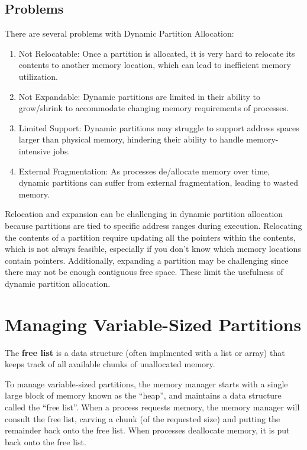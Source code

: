 \documentclass{report}
\newcommand{\definitionBegin}[1]{\begin{tcolorbox}[title={Definition: #1}]}
\newcommand{\definitionEnd}{\end{tcolorbox}}
\begin{document}
\subsection{Problems}
\label{subsec:PROB2}
There are several problems with Dynamic Partition Allocation:
\begin{enumerate}[label=\textit{(\roman*)}]
\item Not Relocatable: Once a partition is allocated, it is very hard to relocate its contents to
  another memory location, which can lead to inefficient memory utilization.
\item Not Expandable: Dynamic partitions are limited in their ability to grow/shrink to
  accommodate changing memory requirements of processes.
\item Limited Support: Dynamic partitions may struggle to support address spaces larger than
  physical memory, hindering their ability to handle memory-intensive jobs.
\item External Fragmentation: As processes de/allocate memory over time, dynamic partitions can
  suffer from external fragmentation, leading to wasted memory.
\end{enumerate}
Relocation and expansion can be challenging in dynamic partition allocation because partitions
are tied to specific address ranges during execution. Relocating the contents of a partition require
updating all the pointers within the contents, which is not always feasible, especially if you don't
know which memory locations contain pointers. Additionally, expanding a partition may be challenging
since there may not be enough contiguous free space. These limit the usefulness of dynamic partition
allocation. 





\section*{Managing Variable-Sized Partitions}
\definitionBegin{Free List}
The \textbf{free list} is a data structure (often implmented with a list or array) that keeps track
of all available chunks of unallocated memory.
\definitionEnd

To manage variable-sized partitions, the memory manager starts with a single large block of memory
known as the ``heap'', and maintains a data structure called the ``free list''. When a process
requests memory, the memory manager will consult the free list, carving a chunk (of the requested
size) and putting the remainder back onto the free list. When processes deallocate memory, it is put
back onto the free list.
\end{document}
